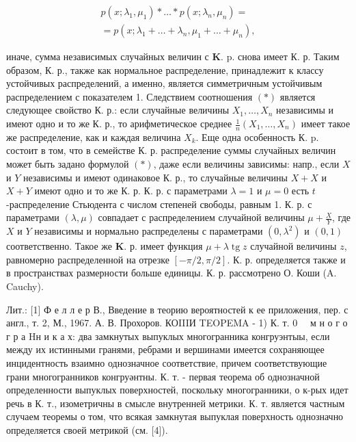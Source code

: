 \documentclass[10pt]{article}
\begin{document}
\[

\begin{gathered}

p\left(x ; \lambda_{1}, \mu_{1}\right) * \ldots * p\left(x ; \lambda_{n}, \mu_{n}\right)= \\

=p\left(x ; \lambda_{1}+\ldots+\lambda_{n}, \mu_{1}+\ldots+\mu_{n}\right),

\end{gathered}

\]



иначе, сумма независимых случайных величин с $\boldsymbol{K}$. p. снова имеет К. р. Таким образом, К. р., также как нормальное распределение, принадлежит к классу устойчивых распределений, а именно, является симметричным устойчивым распределением с показателем 1. Следствием соотношения $(*)$ является следующее свойство К. р.: если случайные величины $X_{1}, \ldots, X_{n}$ независимы и имеют одно и то же К. р., то арифметическое среднее $\frac{1}{n}\left(X_{1}, \ldots, X_{n}\right)$ имеет такое же распределение, как и каждая величина $X_{k}$. Еще одна особенность К. p. состоит в том, что в семействе К. р. распределение суммы случайных величин может быть задано формулой $(*)$, даже если величины зависимы: напр., если $X$ и $Y$ независимы и имеют одинаковое К. р., то случайные величины $X+X$ и $X+Y$ имеют одно и то же К. р. К. р. с параметрами $\lambda=1$ и $\mu=0$ есть $t$-распределение Стьюдента с числом степеней свободы, равным 1. К. р. с параметрами $(\lambda, \mu)$ совпадает с распределением случайной величины $\mu+\frac{X}{Y}$, где $X$ и $Y$ независимы и нормально распределены с параметрами $\left(0, \lambda^{2}\right)$ и $(0,1)$ соответственно. Такое же $\boldsymbol{K}$. р. имеет функция $\mu+\lambda \operatorname{tg} z$ случайной величины $z$, равномерно распределенной на отрезке $[-\pi / 2, \pi / 2]$. К. р. определяется также и в пространствах размерности больше единицы. К. р. рассмотрено О. Коши (A. Cauchy).



Лит.: [1] Ф е л л е р В., Введение в теорию вероятностей к ее приложения, пер. с англ., т. 2, М., 1967. А. В. Прохоров. КОIIIИ TEOPEMA - 1) К. т. $0 \quad$ м н о г о г р а Hн и к а х: два замкнутых выпуклых многогранника конгруэнтыы, если между их истинными гранями, ребрами и вершинами имеется сохраняющее инцидентность взаимно однозначное соответствие, причем соответствующие грани многогранников конгруәнтны. К. т. - первая теорема об однозначной определенности выпуклых поверхностей, поскольку многогранники, о к-рых идет речь в К. т., изометричны в смысле внутренней метрики. К. т. является частным случаем теоремы о том, что всякая замкнутая выпуклая поверхность однозначно определяется своей метрикой (см. [4]).
\end{document}
